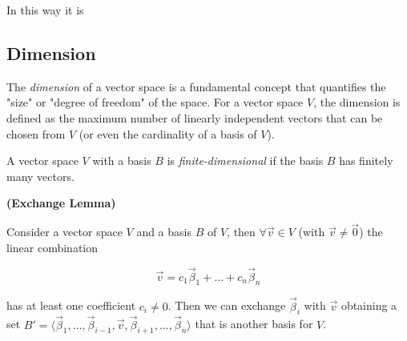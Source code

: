 In this way it is 

\subsection{Dimension}

The \emph{dimension} of a vector space is a fundamental concept that quantifies the "size" or "degree of freedom" of the space. For a vector space $V$, the dimension is defined as the maximum number of linearly independent vectors that can be chosen from $V$ (or even the cardinality of a basis of $V$). 
\\

\begin{tcolorbox}[colback=def_color,colframe=gray] \begin{definition}
    A vector space $V$ with a basis $B$ is \emph{finite-dimensional} if the basis $B$ has finitely many vectors.
\end{definition}
\end{tcolorbox}

\begin{tcolorbox}[colback=def_color,colframe=gray, coltext=black] \begin{lemma}
{\normalfont\textbf{(Exchange Lemma)}}

Consider a vector space $V$ and a basis $B$ of $V$, then $\forall \vec v \in V$ (with $\vec v \neq \vec 0$)
the linear combination 

$$
\vec v = c_1 \vec \beta_1 + \dots + c_n \vec \beta_n
$$

has at least one coefficient $c_i \neq 0$. Then we can exchange $\vec \beta_i$ with $\vec v$ obtaining a set $B' = \langle \vec \beta_1, \dots, \vec \beta_{i-1}, \vec v, \vec \beta_{i+1}, \dots , \vec \beta_n\rangle$ that is another basis for $V$.

\end{lemma}
\end{tcolorbox}

